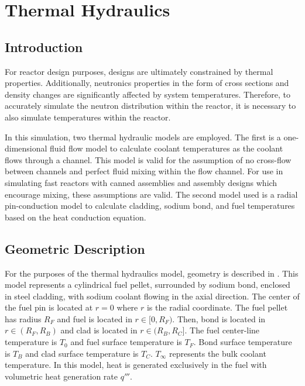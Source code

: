 \chapter{Thermal Hydraulics}
\label{ch:thermalHydraulics}

\section{Introduction}
  For reactor design purposes, designs are ultimately constrained by thermal
  properties. Additionally, neutronics properties in the form of cross sections
  and density changes are significantly affected by system temperatures.
  Therefore, to accurately simulate the neutron distribution within the reactor,
  it is necessary to also simulate temperatures within the reactor.

  In this simulation, two thermal hydraulic models are
  employed. The first is a one-dimensional fluid flow model to calculate coolant
  temperatures as the coolant flows through a channel. This model is valid for
  the assumption of no cross-flow between channels and perfect fluid mixing 
  within the flow channel. For use in simulating fast reactors with canned
  assemblies and assembly designs which encourage mixing, these assumptions are
  valid. The second model used is a radial
  pin-conduction model to calculate cladding, sodium bond, and fuel temperatures
  based on the heat conduction equation.

\section{Geometric Description}
  For the purposes of the thermal hydraulics model, geometry is described in
  . This model represents a cylindrical fuel pellet,
  surrounded by sodium bond, enclosed in steel cladding, with sodium coolant
  flowing in the axial direction. The center of the fuel pin is located at
  $r=0$ where $r$ is the radial coordinate. The fuel pellet has radius $R_F$ and
  fuel is located in $r \in [0,R_F)$. Then, bond is located in $r \in (R_F,R_B)$
  and clad is located in $r \in (R_B,R_C]$. The fuel center-line temperature is
  $T_0$ and fuel surface temperature is $T_F$. Bond surface temperature is
  $T_B$ and clad surface temperature is $T_C$. $T_{\infty}$ represents the bulk
  coolant temperature. In this model, heat is generated exclusively in the fuel
  with volumetric heat generation rate $q'''$. 

